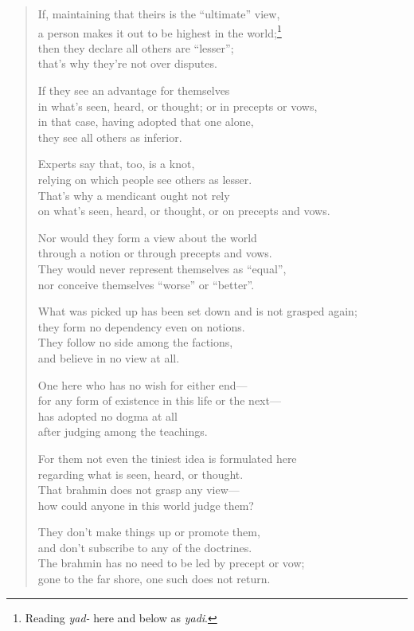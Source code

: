 \documentclass[12pt,openany]{book}%
\begin{document}
\begin{verse}%
If, maintaining that theirs is the “ultimate” view, \\
a person makes it out to be highest in the world;\footnote{Reading \textit{yad-} here and below as \textit{yadi}. } \\
then they declare all others are “lesser”; \\
that’s why they’re not over disputes. 

If they see an advantage for themselves \\
in what’s seen, heard, or thought; or in precepts or vows, \\
in that case, having adopted that one alone, \\
they see all others as inferior. 

Experts say that, too, is a knot, \\
relying on which people see others as lesser. \\
That’s why a mendicant ought not rely \\
on what’s seen, heard, or thought, or on precepts and vows. 

Nor would they form a view about the world \\
through a notion or through precepts and vows. \\
They would never represent themselves as “equal”, \\
nor conceive themselves “worse” or “better”. 

What was picked up has been set down and is not grasped again; \\
they form no dependency even on notions. \\
They follow no side among the factions, \\
and believe in no view at all. 

One here who has no wish for either end—\\
for any form of existence in this life or the next—\\
has adopted no dogma at all \\
after judging among the teachings. 

For them not even the tiniest idea is formulated here \\
regarding what is seen, heard, or thought. \\
That brahmin does not grasp any view—\\
how could anyone in this world judge them? 

They don’t make things up or promote them, \\
and don’t subscribe to any of the doctrines. \\
The brahmin has no need to be led by precept or vow; \\
gone to the far shore, one such does not return. 

%
\end{verse}
\end{document}
